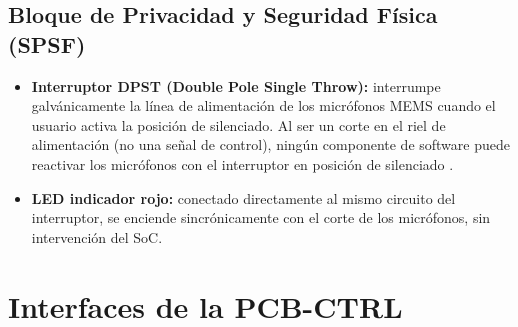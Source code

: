 \subsection{Bloque de Privacidad y Seguridad Física (SPSF)}

\begin{itemize}
  \item \textbf{Interruptor DPST (Double Pole Single Throw):} interrumpe galvánicamente la línea de alimentación de los micrófonos MEMS cuando el usuario activa la posición de silenciado. Al ser un corte en el riel de alimentación (no una señal de control), ningún componente de software puede reactivar los micrófonos con el interruptor en posición de silenciado .
  \item \textbf{LED indicador rojo:} conectado directamente al mismo circuito del interruptor, se enciende sincrónicamente con el corte de los micrófonos, sin intervención del SoC.
\end{itemize}

\section{Interfaces de la PCB-CTRL}
\label{sec:ctrl_interfaces}

